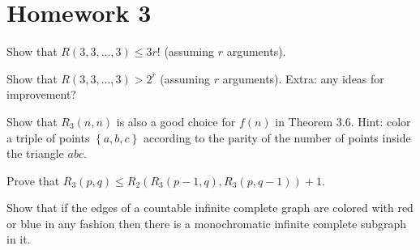 \documentclass[class=article, crop=false]{standalone}
\begin{document}
\section{Homework 3}
\begin{prob}
    Show that $R(3,3,\dots,3) \leq 3r!$ (assuming $r$ arguments).
\end{prob}

\begin{prob}
    Show that $R(3,3,\dots,3)>2^r$ (assuming $r$ arguments). Extra: any ideas for improvement?
\end{prob}

\begin{prob}
    Show that $R_3(n,n)$ is also a good choice for $f(n)$ in Theorem 3.6. Hint: color a triple of points $ \left\{ a,b,c \right\}$ according to the parity of the number of points inside the triangle $abc$.
\end{prob}

\begin{prob}
    Prove that $R_3(p,q) \leq R_2(R_3(p-1,q),R_3(p,q-1))+1$.
\end{prob}

\begin{prob}
    Show that if the edges of a countable infinite complete graph are colored with red or blue in any fashion then there is a monochromatic infinite complete subgraph in it.
\end{prob}
\end{document}
